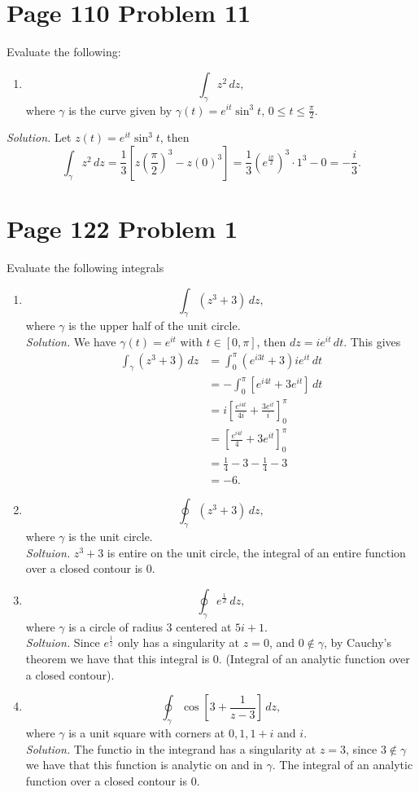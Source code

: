 \documentclass[12pt]{article}
\begin{document}
\section*{Page 110 Problem 11} Evaluate the following:
\begin{enumerate}
    \item[(b)] 
    \[
        \int_{\gamma}z^2\,dz,
    \]
    where $\gamma$ is the curve given by $\gamma(t)=e^{it}\sin^3t,\,0\leq t\leq\frac{\pi}{2}$.
\end{enumerate}
\textit{Solution.} Let $z(t)=e^{it}\sin^3t$, then
    \[
        \int_{\gamma}z^2\,dz=\frac{1}{3}\left[z\left(\frac{\pi}{2}\right)^3-z(0)^3\right]=\frac{1}{3}\left(e^{\frac{i\pi}{2}}\right)^3\cdot1^3-0=-\frac{i}{3}.
    \]
\section*{Page 122 Problem 1}Evaluate the following integrals
\begin{enumerate}[label=(\alph*)]
    \item 
    \[
        \int_{\gamma}(z^3+3)\,dz,
    \]
    where $\gamma$ is the upper half of the unit circle.\\
    \textit{Solution.} We have $\gamma(t)=e^{it}$ with $t\in[0,\pi]$, then $dz=ie^{it}\,dt$. This gives
    \begin{align*}
        \int_{\gamma}(z^3+3)\,dz&=\int_{0}^{\pi}(e^{i3t}+3)ie^{it}\,dt\\
        &=-\int_{0}^{\pi}[e^{i4t}+3e^{it}]\,dt\\
        &=i\left[\frac{e^{i4t}}{4i}+\frac{3e^{it}}{i}\right]_{0}^{\pi}\\
        &=\left[\frac{e^{i4t}}{4}+3e^{it}\right]_{0}^{\pi}\\
        &=\frac{1}{4}-3-\frac{1}{4}-3\\
        &=-6.
    \end{align*}
    \item 
    \[
        \oint_{\gamma}(z^3+3)\,dz,
    \]
    where $\gamma$ is the unit circle.\\
    \textit{Soltuion.} $z^3+3$ is entire on the unit circle, the integral of an entire function over a closed contour is 0.
    \item 
    \[
        \oint_{\gamma}e^{\frac{1}{Z}}\,dz,
    \]
    where $\gamma$ is a circle of radius 3 centered at $5i+1$.\\
    \textit{Soltuion.} Since $e^{\frac{1}{z}}$ only has a singularity at $z=0$, and $0\not\in\gamma$, by Cauchy's theorem we have that this integral is 0. (Integral of an analytic function over a closed contour).
    \item 
    \[
        \oint_{\gamma}\cos\left[3+\frac{1}{z-3}\right]\,dz,
    \]
    where $\gamma$ is a unit square with corners at $0,1,1+i$ and $i$.\\
    \textit{Solution.} The functio in the integrand has a singularity at $z=3$, since $3\not\in\gamma$ we have that this function is analytic on and in $\gamma$. The integral of an analytic function over a closed contour is 0.
\end{enumerate}
\end{document}
